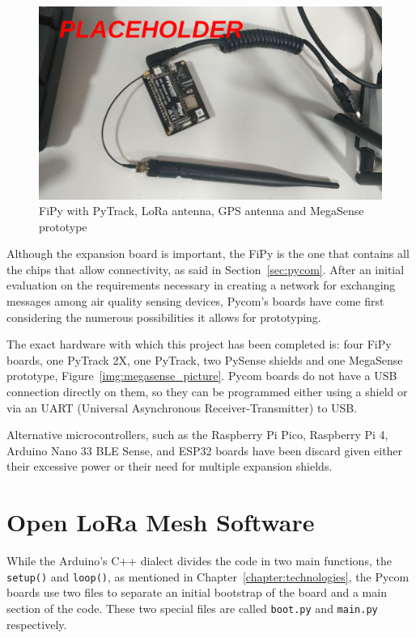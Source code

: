 		\begin{figure}[h]
			\centering
			\includegraphics[width=\textwidth]{resources/img/chap5/mesh-irl-picture}
			\caption{FiPy with PyTrack, LoRa antenna, GPS antenna and MegaSense prototype}
			\label{img:irl_picture_1}
		\end{figure}
		
		Although the expansion board is important, the FiPy is the one that contains all the chips that allow connectivity, as said in Section~\ref{sec:pycom}.
		After an initial evaluation on the requirements necessary in creating a network for exchanging messages among air quality sensing devices, Pycom's boards have come first considering the numerous possibilities it allows for prototyping.
		
		The exact hardware with which this project has been completed is: four FiPy boards, one PyTrack 2X, one PyTrack, two PySense shields and one MegaSense prototype, Figure~\ref{img:megasense_picture}.
		Pycom boards do not have a USB connection directly on them, so they can be programmed either using a shield or via an UART (Universal Asynchronous Receiver-Transmitter) to USB.
		
		Alternative microcontrollers, such as the Raspberry Pi Pico, Raspberry Pi 4, Arduino Nano 33 BLE Sense, and ESP32 boards have been discard given either their excessive power or their need for multiple expansion shields.
				
	\section{Open LoRa Mesh Software}\label{sec:software_solution}
	
		While the Arduino's C++ dialect divides the code in two main functions, the \texttt{setup()} and \texttt{loop()}, as mentioned in Chapter~\ref{chapter:technologies}, the Pycom boards use two files to separate an initial bootstrap of the board and a main section of the code.
		These two special files are called \texttt{boot.py} and \texttt{main.py} respectively.
		
